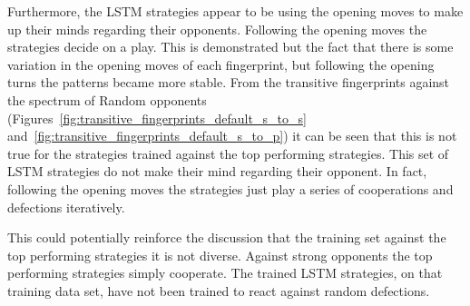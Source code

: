 Furthermore, the LSTM strategies appear to be using the opening moves to make up
their minds regarding their opponents. Following the opening moves the
strategies decide on a play. This is demonstrated but the fact that there is
some variation in the opening moves of each fingerprint, but following the
opening turns the patterns became more stable. From the transitive fingerprints
against the spectrum of Random opponents
(Figures~\ref{fig:transitive_fingerprints_default_s_to_s}
and~\ref{fig:transitive_fingerprints_default_s_to_p}) it can be seen that this
is not true for the strategies trained against the top performing strategies.
This set of LSTM strategies do not make their mind regarding their opponent. In
fact, following the opening moves the strategies just play a series of
cooperations and defections iteratively.

This could potentially reinforce the discussion that the training set against
the top performing strategies it is not diverse. Against strong opponents the
top performing strategies simply cooperate. The trained LSTM strategies, on that
training data set, have not been trained to react against random defections.

